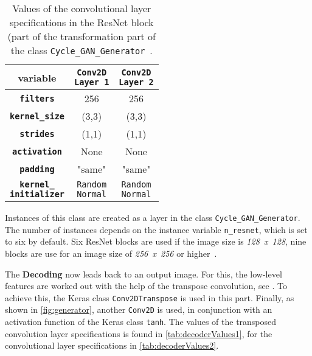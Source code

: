 \documentclass[fleqn,10pt]{SelfArx} %
\begin{document}
\begin{table}[htb]
\centering
\caption{Values of the convolutional layer specifications in the \ac{ResNet} block (part of the transformation part of the class \texttt{Cycle\_GAN\_Generator}~\cite{image-to-image-ccan}.}
\label{tab:transformerValues}
\begin{tabular}{c c c}
\textbf{variable} & \makecell[cc]{\textbf{\texttt{Conv2D}} \\ \textbf{\texttt{Layer 1}}} & \makecell[cc]{\textbf{\texttt{Conv2D}} \\ \textbf{\texttt{Layer 2}}} \\ \hline
\textbf{\texttt{filters}} & 256 & 256 \\ \hline
\textbf{\texttt{kernel\_size}} & (3,3) & (3,3) \\ \hline
\textbf{\texttt{strides}} & (1,1) &  (1,1) \\ \hline
\textbf{\texttt{activation}} & None & None \\ \hline 
\textbf{\texttt{padding}} & "same" & "same" \\ \hline
\makecell[cc]{\textbf{\texttt{kernel\_}} \\ \textbf{\texttt{initializer}}} & \makecell[cc]{\texttt{Random} \\ \texttt{Normal}} & \makecell[cc]{\texttt{Random} \\ \texttt{Normal}} \\ \hline
\end{tabular}
\end{table}

Instances of this class are created as a layer in the class \texttt{Cycle\_GAN\_Generator}. The number of instances depends on the instance variable \texttt{n\_resnet}, which is set to six by default. Six \ac{ResNet} blocks are used if the image size is \textit{128~x~128}, nine blocks are use for an image size of \textit{256~x~256} or higher~\cite{image-to-image-ccan}.

The \textbf{Decoding} now leads back to an output image. For this, the low-level features are worked out with the help of the transpose convolution, see \cite{Introduction-to-Cycle-GANs}. To achieve this, the Keras class \texttt{Conv2DTranspose} is used in this part. Finally, as shown in \autoref{fig:generator}, another \texttt{Conv2D} is used, in conjunction with an activation function of the Keras class \texttt{tanh}. The values of the transposed convolution layer specifications is found in \autoref{tab:decoderValues1}, for the convolutional layer specifications in \autoref{tab:decoderValues2}.
\end{document}
